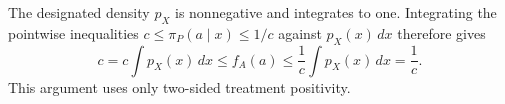 The designated density \(p_X\) is nonnegative and integrates to one. Integrating the pointwise inequalities \(c\le\pi_P(a\mid x)\le1/c\) against \(p_X(x)\,dx\) therefore gives
\[
c=c\int p_X(x)\,dx\le f_A(a)\le\frac1c\int p_X(x)\,dx=\frac1c.
\]
This argument uses only two-sided treatment positivity.